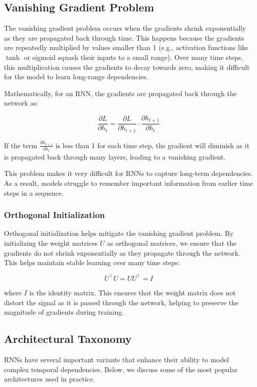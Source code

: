 \documentclass{article}
\begin{document}
\subsection{Vanishing Gradient Problem}
The vanishing gradient problem occurs when the gradients shrink exponentially as they are propagated back through time. This happens because the gradients are repeatedly multiplied by values smaller than 1 (e.g., activation functions like \(\tanh\) or sigmoid squash their inputs to a small range). Over many time steps, this multiplication causes the gradients to decay towards zero, making it difficult for the model to learn long-range dependencies.

Mathematically, for an RNN, the gradients are propagated back through the network as:

\[
\frac{\partial L}{\partial h_t} = \frac{\partial L}{\partial h_{t+1}} \cdot \frac{\partial h_{t+1}}{\partial h_t}
\]

If the term \(\frac{\partial h_{t+1}}{\partial h_t}\) is less than 1 for each time step, the gradient will diminish as it is propagated back through many layers, leading to a vanishing gradient.

This problem makes it very difficult for RNNs to capture long-term dependencies. As a result, models struggle to remember important information from earlier time steps in a sequence.

\subsubsection{Orthogonal Initialization}
Orthogonal initialization helps mitigate the vanishing gradient problem. By initializing the weight matrices \(U\) as orthogonal matrices, we ensure that the gradients do not shrink exponentially as they propagate through the network. This helps maintain stable learning over many time steps:

\[
U^\top U = U U^\top = I
\]

where \(I\) is the identity matrix. This ensures that the weight matrix does not distort the signal as it is passed through the network, helping to preserve the magnitude of gradients during training.

\subsection{Architectural Taxonomy}
RNNs have several important variants that enhance their ability to model complex temporal dependencies. Below, we discuss some of the most popular architectures used in practice.
\end{document}
